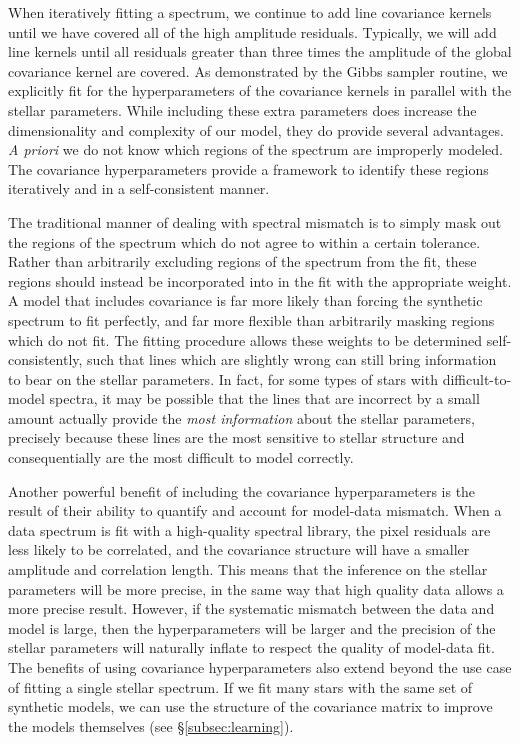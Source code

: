 \documentclass[iop,floatfix]{emulateapj}
\begin{document}

When iteratively fitting a spectrum, we continue to add line covariance kernels until we have covered all of the high amplitude residuals. Typically, we will add line kernels until all residuals greater than three times the amplitude of the global covariance kernel are covered.  As demonstrated by the Gibbs sampler routine, we explicitly fit for the
hyperparameters of the covariance kernels in parallel with the
stellar parameters. While including these extra parameters does increase the
dimensionality and complexity of our model, they do provide several advantages.
\emph{A priori} we do not know which regions of the spectrum are improperly
modeled. The covariance hyperparameters provide a framework to identify these
regions iteratively and in a self-consistent manner. 

The traditional manner of dealing with spectral mismatch is to simply mask out the regions of the spectrum which do not agree to within a certain tolerance.  Rather than arbitrarily excluding regions of the spectrum from the fit, these regions should instead be incorporated into in the fit with the appropriate weight. A model that includes covariance is far more likely than forcing the synthetic spectrum to fit perfectly, and far more flexible than arbitrarily masking regions which do not fit. The fitting procedure allows these weights to be determined self-consistently, such that lines which are slightly wrong can still bring information to bear on the stellar parameters. In fact, for some types of stars with difficult-to-model spectra, it may be possible that the lines that are incorrect by a small amount actually provide the \emph{most information} about the stellar parameters, precisely because these lines are the most sensitive to stellar structure and consequentially are the most difficult to model correctly.

Another powerful benefit of including the covariance hyperparameters is the result of their ability to quantify and account for model-data mismatch. When a data spectrum is fit with a high-quality spectral library, the pixel residuals are less likely to be correlated, and the covariance structure will have a smaller amplitude and correlation length. This means that the inference on the stellar parameters will be more precise, in the same way that high quality data allows a more precise result. However, if the systematic mismatch between the data and model is large, then the hyperparameters will be larger and the precision of the stellar parameters will naturally inflate to respect the quality of model-data fit. The benefits of using covariance hyperparameters also extend beyond the use case of fitting a single stellar spectrum. If we fit many stars with the same set of synthetic models, we can use the structure of the covariance matrix to improve the models themselves (see \S\ref{subsec:learning}).
\end{document}
